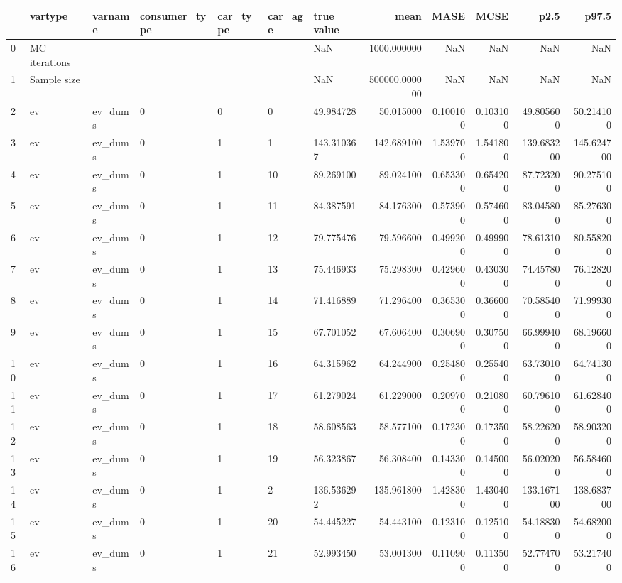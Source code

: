\begin{tabular}{lllllllrrrrr}
\toprule
 & vartype & varname & consumer_type & car_type & car_age & true value & mean & MASE & MCSE & p2.5 & p97.5 \\
\midrule
0 & MC iterations &  &  &  &  & NaN & 1000.000000 & NaN & NaN & NaN & NaN \\
1 & Sample size &  &  &  &  & NaN & 500000.000000 & NaN & NaN & NaN & NaN \\
2 & ev & ev_dums & 0 & 0 & 0 & 49.984728 & 50.015000 & 0.100100 & 0.103100 & 49.805600 & 50.214100 \\
3 & ev & ev_dums & 0 & 1 & 1 & 143.310367 & 142.689100 & 1.539700 & 1.541800 & 139.683200 & 145.624700 \\
4 & ev & ev_dums & 0 & 1 & 10 & 89.269100 & 89.024100 & 0.653300 & 0.654200 & 87.723200 & 90.275100 \\
5 & ev & ev_dums & 0 & 1 & 11 & 84.387591 & 84.176300 & 0.573900 & 0.574600 & 83.045800 & 85.276300 \\
6 & ev & ev_dums & 0 & 1 & 12 & 79.775476 & 79.596600 & 0.499200 & 0.499900 & 78.613100 & 80.558200 \\
7 & ev & ev_dums & 0 & 1 & 13 & 75.446933 & 75.298300 & 0.429600 & 0.430300 & 74.457800 & 76.128200 \\
8 & ev & ev_dums & 0 & 1 & 14 & 71.416889 & 71.296400 & 0.365300 & 0.366000 & 70.585400 & 71.999300 \\
9 & ev & ev_dums & 0 & 1 & 15 & 67.701052 & 67.606400 & 0.306900 & 0.307500 & 66.999400 & 68.196600 \\
10 & ev & ev_dums & 0 & 1 & 16 & 64.315962 & 64.244900 & 0.254800 & 0.255400 & 63.730100 & 64.741300 \\
11 & ev & ev_dums & 0 & 1 & 17 & 61.279024 & 61.229000 & 0.209700 & 0.210800 & 60.796100 & 61.628400 \\
12 & ev & ev_dums & 0 & 1 & 18 & 58.608563 & 58.577100 & 0.172300 & 0.173500 & 58.226200 & 58.903200 \\
13 & ev & ev_dums & 0 & 1 & 19 & 56.323867 & 56.308400 & 0.143300 & 0.145000 & 56.020200 & 56.584600 \\
14 & ev & ev_dums & 0 & 1 & 2 & 136.536292 & 135.961800 & 1.428300 & 1.430400 & 133.167100 & 138.683700 \\
15 & ev & ev_dums & 0 & 1 & 20 & 54.445227 & 54.443100 & 0.123100 & 0.125100 & 54.188300 & 54.682000 \\
16 & ev & ev_dums & 0 & 1 & 21 & 52.993450 & 53.001300 & 0.110900 & 0.113500 & 52.774700 & 53.217400 \\

\end{tabular}
